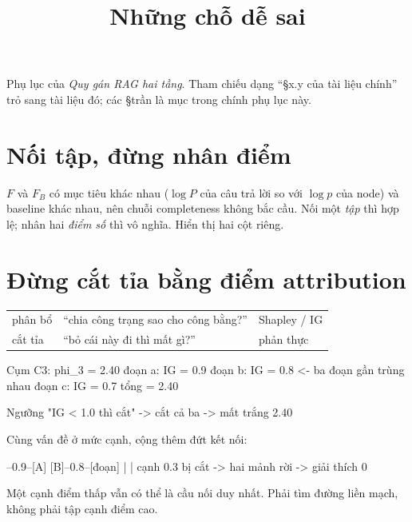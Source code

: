 \documentclass[11pt,a4paper]{article}
\title{\bfseries Những chỗ dễ sai}
\author{}
\date{}
\begin{document}
\maketitle
\vspace{-1.1cm}

\noindent Phụ lục của \emph{Quy gán RAG hai tầng}. Tham chiếu dạng ``\S x.y của tài
liệu chính'' trỏ sang tài liệu đó; các \S trần là mục trong chính phụ lục này.

\medskip
\tableofcontents
\bigskip

\section{Nối tập, đừng nhân điểm}
\label{sec:nonhan}

$F$ và $F_B$ có mục tiêu khác nhau ($\log P$ của câu trả lời so với $\log p$ của node) và baseline khác nhau, nên chuỗi completeness không bắc cầu. Nối một \emph{tập} thì hợp lệ; nhân hai \emph{điểm số} thì vô nghĩa. Hiển thị hai cột riêng.

\section{Đừng cắt tỉa bằng điểm attribution}
\label{sec:prune}

\begin{center}
\begin{tabular}{@{}lll@{}}
\toprule
phân bổ & ``chia công trạng sao cho công bằng?'' & Shapley / IG \\
cắt tỉa & ``bỏ cái này đi thì mất gì?'' & phản thực \\
\bottomrule
\end{tabular}
\end{center}

\begin{dia}
Cụm C3:  phi_3 = 2.40
  đoạn a: IG = 0.9
  đoạn b: IG = 0.8      <- ba đoạn gần trùng nhau
  đoạn c: IG = 0.7
         tổng = 2.40

Ngưỡng "IG < 1.0 thì cắt"  ->  cắt cả ba  ->  mất trắng 2.40
\end{dia}

Cùng vấn đề ở mức cạnh, cộng thêm đứt kết nối:

\begin{dia}
[hỏi]--0.9--[A]      [B]--0.8--[đoạn]
               |       |
            cạnh 0.3 bị cắt -> hai mảnh rời -> giải thích 0%
\end{dia}

Một cạnh điểm thấp vẫn có thể là cầu nối duy nhất. Phải tìm đường liền mạch, không phải tập cạnh điểm cao.
\end{document}
